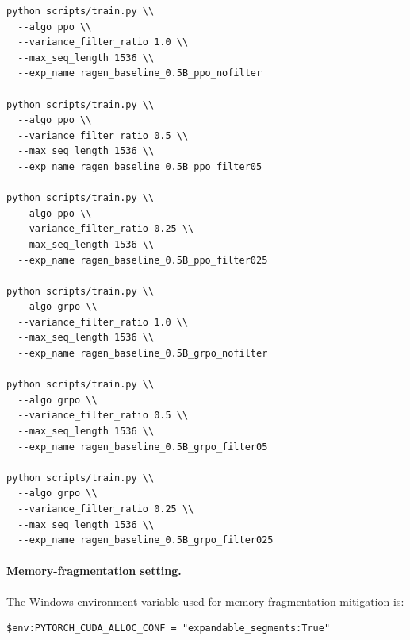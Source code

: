 \begin{Verbatim}[fontsize=\small,breaklines=true,breakanywhere=true]
python scripts/train.py \\
  --algo ppo \\
  --variance_filter_ratio 1.0 \\
  --max_seq_length 1536 \\
  --exp_name ragen_baseline_0.5B_ppo_nofilter

python scripts/train.py \\
  --algo ppo \\
  --variance_filter_ratio 0.5 \\
  --max_seq_length 1536 \\
  --exp_name ragen_baseline_0.5B_ppo_filter05

python scripts/train.py \\
  --algo ppo \\
  --variance_filter_ratio 0.25 \\
  --max_seq_length 1536 \\
  --exp_name ragen_baseline_0.5B_ppo_filter025

python scripts/train.py \\
  --algo grpo \\
  --variance_filter_ratio 1.0 \\
  --max_seq_length 1536 \\
  --exp_name ragen_baseline_0.5B_grpo_nofilter

python scripts/train.py \\
  --algo grpo \\
  --variance_filter_ratio 0.5 \\
  --max_seq_length 1536 \\
  --exp_name ragen_baseline_0.5B_grpo_filter05

python scripts/train.py \\
  --algo grpo \\
  --variance_filter_ratio 0.25 \\
  --max_seq_length 1536 \\
  --exp_name ragen_baseline_0.5B_grpo_filter025
\end{Verbatim}

\paragraph{Memory-fragmentation setting.}
The Windows environment variable used for memory-fragmentation mitigation is:
\begin{Verbatim}[fontsize=\small,breaklines=true,breakanywhere=true]
$env:PYTORCH_CUDA_ALLOC_CONF = "expandable_segments:True"
\end{Verbatim}
